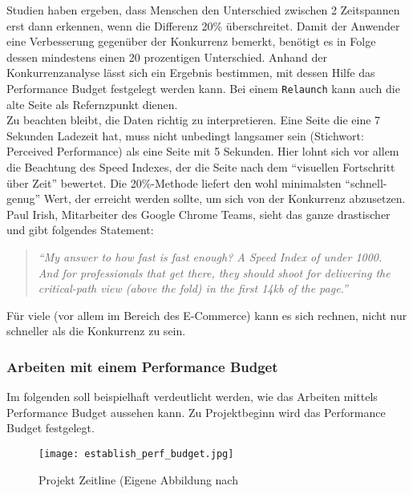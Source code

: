 				Studien haben ergeben, dass Menschen den Unterschied zwischen 2 Zeitspannen erst dann erkennen, wenn die Differenz 20\% überschreitet.\autocite{seow09} Damit der Anwender eine Verbesserung gegenüber der Konkurrenz bemerkt, benötigt es in Folge dessen mindestens einen 20 prozentigen Unterschied. Anhand der Konkurrenzanalyse lässt sich ein Ergebnis bestimmen, mit dessen Hilfe das Performance Budget festgelegt werden kann. Bei einem \texttt{Relaunch} kann auch die alte Seite als Refernzpunkt dienen.\\
				Zu beachten bleibt, die Daten richtig zu interpretieren. Eine Seite die eine 7 Sekunden Ladezeit hat, muss nicht unbedingt langsamer sein (Stichwort: Perceived Performance) als eine Seite mit 5 Sekunden. Hier lohnt sich vor allem die Beachtung des Speed Indexes, der die Seite nach dem "`visuellen Fortschritt über Zeit"' bewertet. Die 20\%-Methode liefert den wohl minimalsten "`schnell-genug"' Wert, der erreicht werden sollte, um sich von der Konkurrenz abzusetzen.\\
				Paul Irish, Mitarbeiter des Google Chrome Teams, sieht das ganze drastischer und gibt folgendes Statement:
				\begin{quote}
					\textit{"`My answer to how fast is fast enough? A Speed Index of under 1000.\\
					And for professionals that get there, they should shoot for delivering the critical-path view (above the fold) in the first 14kb of the page."'} \autocite{irish14}
				\end{quote}
				Für viele (vor allem im Bereich des E-Commerce) kann es sich rechnen, nicht nur schneller als die Konkurrenz zu sein.

		\subsubsection{Arbeiten mit einem Performance Budget} %
		\label{ssub:arbeiten_mit_einem_performance_budget}
			Im folgenden soll beispielhaft verdeutlicht werden, wie das Arbeiten mittels Performance Budget aussehen kann. Zu Projektbeginn wird das Performance Budget festgelegt.

			\begin{figure}[htbp]
				\begin{center}
					\texttt{[image: establish\_perf\_budget.jpg]}
					\caption{Projekt Zeitline (Eigene Abbildung nach \autocite[p. 58]{kovalcin15}}
					\label{fig:establish_perf_budget}
				\end{center}
			\end{figure}
			

